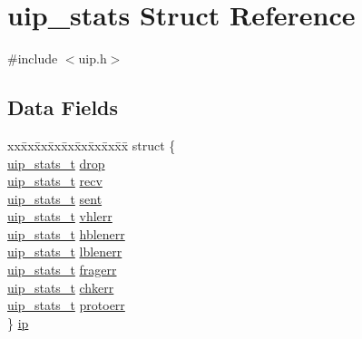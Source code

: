 \hypertarget{structuip__stats}{
\section{uip\_\-stats Struct Reference}
\label{structuip__stats}
}


{\ttfamily \#include $<$uip.h$>$}

\subsection*{Data Fields}
\begin{DoxyCompactItemize}
\item 
\begin{tabbing}
xx\=xx\=xx\=xx\=xx\=xx\=xx\=xx\=xx\=\kill
struct \{\\
\>\hyperlink{group__uipfw_ga727459e5c4f777543c81ffffa3df3f0c}{uip\_stats\_t} \hyperlink{structuip__stats_a5d8996950cdf3d8130cc3ad340eb9dff}{drop}\\
\>\hyperlink{group__uipfw_ga727459e5c4f777543c81ffffa3df3f0c}{uip\_stats\_t} \hyperlink{structuip__stats_a7f7bb2145afba5df00c6e10ddefa8ae1}{recv}\\
\>\hyperlink{group__uipfw_ga727459e5c4f777543c81ffffa3df3f0c}{uip\_stats\_t} \hyperlink{structuip__stats_adc69abadd5aa07c7d74f9292db2cd93c}{sent}\\
\>\hyperlink{group__uipfw_ga727459e5c4f777543c81ffffa3df3f0c}{uip\_stats\_t} \hyperlink{structuip__stats_ab93e351c3abba0c700b26b7b07e9527d}{vhlerr}\\
\>\hyperlink{group__uipfw_ga727459e5c4f777543c81ffffa3df3f0c}{uip\_stats\_t} \hyperlink{structuip__stats_a0c816f34c0187f2154c91a18d3ad87c8}{hblenerr}\\
\>\hyperlink{group__uipfw_ga727459e5c4f777543c81ffffa3df3f0c}{uip\_stats\_t} \hyperlink{structuip__stats_a6157452bdc9921f44b2e22e4b5969258}{lblenerr}\\
\>\hyperlink{group__uipfw_ga727459e5c4f777543c81ffffa3df3f0c}{uip\_stats\_t} \hyperlink{structuip__stats_a8082509468b2ac80ed7746aa1a5bc4f7}{fragerr}\\
\>\hyperlink{group__uipfw_ga727459e5c4f777543c81ffffa3df3f0c}{uip\_stats\_t} \hyperlink{structuip__stats_a7675e6b9adbddbd545d3aac8ca092fbb}{chkerr}\\
\>\hyperlink{group__uipfw_ga727459e5c4f777543c81ffffa3df3f0c}{uip\_stats\_t} \hyperlink{structuip__stats_ab4622e2599ff3a592db09219b2641682}{protoerr}\\
\} \hyperlink{structuip__stats_a5db1a5af2cd3ba9a1090a802c2ab73b0}{ip}\\


\end{tabbing}
\end{DoxyCompactItemize}
